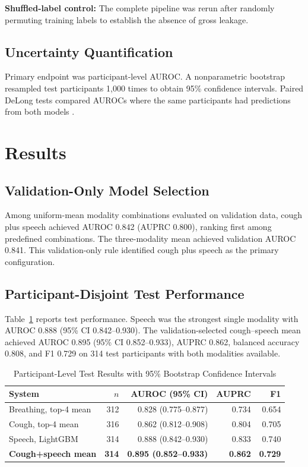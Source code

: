 \documentclass[conference]{IEEEtran}
\begin{document}
\textbf{Shuffled-label control:} The complete pipeline was rerun after randomly permuting training labels to establish the absence of gross leakage.

\subsection{Uncertainty Quantification}

Primary endpoint was participant-level AUROC. A nonparametric bootstrap resampled test participants 1,000 times to obtain 95\% confidence intervals. Paired DeLong tests compared AUROCs where the same participants had predictions from both models \cite{delong1988auc}.

\section{Results}

\subsection{Validation-Only Model Selection}

Among uniform-mean modality combinations evaluated on validation data, cough plus speech achieved AUROC 0.842 (AUPRC 0.800), ranking first among predefined combinations. The three-modality mean achieved validation AUROC 0.841. This validation-only rule identified cough plus speech as the primary configuration.

\subsection{Participant-Disjoint Test Performance}

Table~\ref{tab:results} reports test performance. Speech was the strongest single modality with AUROC 0.888 (95\% CI 0.842--0.930). The validation-selected cough--speech mean achieved AUROC 0.895 (95\% CI 0.852--0.933), AUPRC 0.862, balanced accuracy 0.808, and F1 0.729 on 314 test participants with both modalities available.

\begin{table}[!t]
\caption{Participant-Level Test Results with 95\% Bootstrap Confidence Intervals}
\label{tab:results}
\centering
\footnotesize
\setlength{\tabcolsep}{2.8pt}
\begin{tabular}{lrrrr}
\toprule
System & $n$ & AUROC (95\% CI) & AUPRC & F1 \\
\midrule
Breathing, top-4 mean & 312 & 0.828 (0.775--0.877) & 0.734 & 0.654 \\
Cough, top-4 mean     & 316 & 0.862 (0.812--0.908) & 0.804 & 0.705 \\
Speech, LightGBM      & 314 & 0.888 (0.842--0.930) & 0.833 & 0.740 \\
\midrule
\textbf{Cough+speech mean} & \textbf{314} & \textbf{0.895 (0.852--0.933)} & \textbf{0.862} & \textbf{0.729} \\
\bottomrule
\end{tabular}
\end{table}
\end{document}
